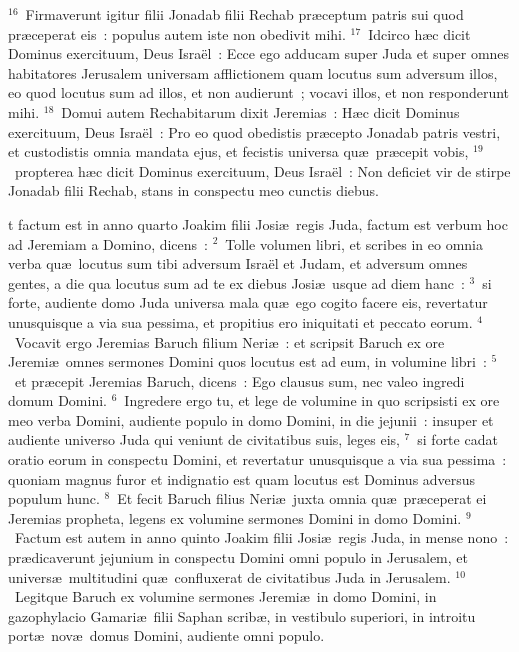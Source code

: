 ${}^{16}$~Firmaverunt igitur filii Jonadab filii Rechab pr\ae ceptum patris sui quod pr\ae ceperat eis~: populus autem iste non obedivit mihi.
${}^{17}$~Idcirco h\ae c dicit Dominus exercituum, Deus Isra\"el~: Ecce ego adducam super Juda et super omnes habitatores Jerusalem universam afflictionem quam locutus sum adversum illos, eo quod locutus sum ad illos, et non audierunt~; vocavi illos, et non responderunt mihi.
${}^{18}$~Domui autem Rechabitarum dixit Jeremias~: H\ae c dicit Dominus exercituum, Deus Isra\"el~: Pro eo quod obedistis pr\ae cepto Jonadab patris vestri, et custodistis omnia mandata ejus, et fecistis universa qu\ae\ pr\ae cepit vobis,
${}^{19}$~propterea h\ae c dicit Dominus exercituum, Deus Isra\"el~: Non deficiet vir de stirpe Jonadab filii Rechab, stans in conspectu meo cunctis diebus.

\bchapter
{}t factum est in anno quarto Joakim filii Josi\ae\ regis Juda, factum est verbum hoc ad Jeremiam a Domino, dicens~:
${}^{2}$~Tolle volumen libri, et scribes in eo omnia verba qu\ae\ locutus sum tibi adversum Isra\"el et Judam, et adversum omnes gentes, a die qua locutus sum ad te ex diebus Josi\ae\ usque ad diem hanc~:
${}^{3}$~si forte, audiente domo Juda universa mala qu\ae\ ego cogito facere eis, revertatur unusquisque a via sua pessima, et propitius ero iniquitati et peccato eorum.
${}^{4}$~Vocavit ergo Jeremias Baruch filium Neri\ae~: et scripsit Baruch ex ore Jeremi\ae\ omnes sermones Domini quos locutus est ad eum, in volumine libri~:
${}^{5}$~et pr\ae cepit Jeremias Baruch, dicens~: Ego clausus sum, nec valeo ingredi domum Domini.
${}^{6}$~Ingredere ergo tu, et lege de volumine in quo scripsisti ex ore meo verba Domini, audiente populo in domo Domini, in die jejunii~: insuper et audiente universo Juda qui veniunt de civitatibus suis, leges eis,
${}^{7}$~si forte cadat oratio eorum in conspectu Domini, et revertatur unusquisque a via sua pessima~: quoniam magnus furor et indignatio est quam locutus est Dominus adversus populum hunc.
${}^{8}$~Et fecit Baruch filius Neri\ae\ juxta omnia qu\ae\ pr\ae ceperat ei Jeremias propheta, legens ex volumine sermones Domini in domo Domini.
${}^{9}$~Factum est autem in anno quinto Joakim filii Josi\ae\ regis Juda, in mense nono~: pr\ae dicaverunt jejunium in conspectu Domini omni populo in Jerusalem, et univers\ae\ multitudini qu\ae\ confluxerat de civitatibus Juda in Jerusalem.
${}^{10}$~Legitque Baruch ex volumine sermones Jeremi\ae\ in domo Domini, in gazophylacio Gamari\ae\ filii Saphan scrib\ae , in vestibulo superiori, in introitu port\ae\ nov\ae\ domus Domini, audiente omni populo.
